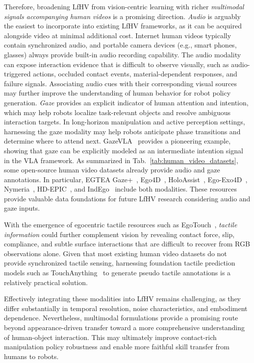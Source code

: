 \documentclass[Afour,sageh,times]{sagej}
\begin{document}
Therefore, broadening LfHV from vision-centric learning with richer \textit{multimodal signals accompanying human videos} is a promising direction. \textit{Audio} is arguably the easiest to incorporate into existing LfHV frameworks, as it can be acquired alongside video at minimal additional cost. Internet human videos typically contain synchronized audio, and portable camera devices (e.g., smart phones, glasses) always provide built-in audio recording capability. The audio modality can expose interaction evidence that is difficult to observe visually, such as audio-triggered actions, occluded contact events, material-dependent responses, and failure signals. Associating audio cues with their corresponding visual sources~\citep{seth2026egoavu,zhu2026egosound} may further improve the understanding of human behavior for robot policy generation. \textit{Gaze} provides an explicit indicator of human attention and intention, which may help robots localize task-relevant objects and resolve ambiguous interaction targets. In long-horizon manipulation and active perception settings, harnessing the gaze modality may help robots anticipate phase transitions and determine where to attend next. GazeVLA~\citep{li2026gazevla} provides a pioneering example, showing that gaze can be explicitly modeled as an intermediate intention signal in the VLA framework. As summarized in Tab.~\ref{tab:human_video_datasets}, some open-source human video datasets already provide audio and gaze annotations. In particular, EGTEA Gaze+~\citep{li2018eye}, Ego4D~\citep{grauman2022ego4d}, HoloAssist~\citep{wang2023holoassist}, Ego-Exo4D~\citep{grauman2023ego}, Nymeria~\citep{ma2024nymeria}, HD-EPIC~\citep{perrett2025hd}, and IndEgo~\citep{chavan2025indego} include both modalities. These resources provide valuable data foundations for future LfHV research considering audio and gaze inputs.


With the emergence of egocentric tactile resources such as EgoTouch~\citep{zhou2026touchanything}, \textit{tactile information} could further complement vision by revealing contact force, slip, compliance, and subtle surface interactions that are difficult to recover from RGB observations alone. Given that most existing human video datasets do not provide synchronized tactile sensing, harnessing foundation tactile prediction models such as TouchAnything~\citep{zhou2026touchanything} to generate pseudo tactile annotations is a relatively practical solution.


Effectively integrating these modalities into LfHV remains challenging, as they differ substantially in temporal resolution, noise characteristics, and embodiment dependence. Nevertheless, multimodal formulations provide a promising route beyond appearance-driven transfer toward a more comprehensive understanding of human-object interaction. This may ultimately improve contact-rich manipulation policy robustness and enable more faithful skill transfer from humans to robots.
\end{document}
